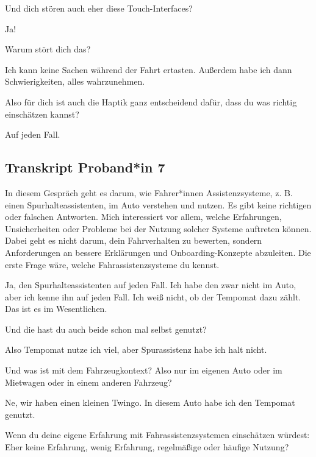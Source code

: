 \interviewerin
Und dich stören auch eher diese Touch-Interfaces?

Ja!

\interviewerin
Warum stört dich das?

Ich kann keine Sachen während der Fahrt ertasten. Außerdem habe ich dann
Schwierigkeiten, alles wahrzunehmen.

\interviewerin
Also für dich ist auch die Haptik ganz entscheidend dafür, dass du was
richtig einschätzen kannst?

Auf jeden Fall.



\clearpage
\subsection{Transkript Proband*in 7}
\label{subsec:transkript-p7}

\interviewerin
In diesem Gespräch geht es darum, wie Fahrer*innen Assistenzsysteme,
z. B. einen Spurhalteassistenten, im Auto verstehen und nutzen. Es gibt
keine richtigen oder falschen Antworten. Mich interessiert vor allem,
welche Erfahrungen, Unsicherheiten oder Probleme bei der Nutzung solcher
Systeme auftreten können. Dabei geht es nicht darum, dein Fahrverhalten
zu bewerten, sondern Anforderungen an bessere Erklärungen und
Onboarding-Konzepte abzuleiten. Die erste Frage wäre, welche
Fahrassistenzsysteme du kennst.

Ja, den Spurhalteassistenten auf jeden Fall. Ich habe den zwar nicht im
Auto, aber ich kenne ihn auf jeden Fall. Ich weiß nicht, ob der Tempomat
dazu zählt. Das ist es im Wesentlichen.

\interviewerin
Und die hast du auch beide schon mal selbst genutzt?

Also Tempomat nutze ich viel, aber Spurassistenz habe ich halt nicht.

\interviewerin
Und was ist mit dem Fahrzeugkontext? Also nur im eigenen Auto oder im
Mietwagen oder in einem anderen Fahrzeug?

Ne, wir haben einen kleinen Twingo. In diesem Auto habe ich den Tempomat
genutzt.

\interviewerin
Wenn du deine eigene Erfahrung mit Fahrassistenzsystemen einschätzen
würdest: Eher keine Erfahrung, wenig Erfahrung, regelmäßige oder
häufige Nutzung?

